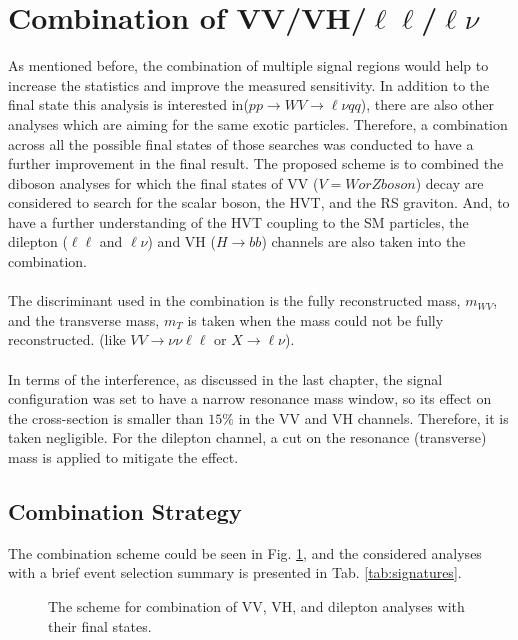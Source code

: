 \section{Combination of VV/VH/$\ell\ell$/$\ell\nu$}
As mentioned before, the combination of multiple signal regions would help to increase the statistics and improve the measured sensitivity.  In addition to the final state this analysis is interested in($pp\to WV \to \ell\nu qq$), there are also other analyses which are aiming for the same exotic particles. Therefore, a combination across all the possible final states of those searches was conducted to have a further improvement in the final result. The proposed scheme is to combined the diboson analyses for which the final states of VV ($V=W or Z boson$) decay are considered to search for the scalar boson, the HVT, and the RS graviton. And, to have a further understanding of the HVT coupling to the SM particles, the dilepton ($\ell\ell$ and $\ell\nu$) and VH ($H\to bb$) channels are also taken into the combination.
\\
\\The discriminant used in the combination is the fully reconstructed mass, $m_{WV}$, and the transverse mass, $m_{T}$ is taken when the mass could not be fully reconstructed. (like $VV\to\nu\nu\ell\ell$ or $X\to\ell\nu$).
\\
\\In terms of the interference, as discussed in the last chapter, the signal configuration was set to have a narrow resonance mass window, so its effect on the cross-section is smaller than $15\%$ in the VV and VH channels. Therefore, it is taken negligible. For the dilepton channel, a cut on the resonance (transverse) mass is applied to mitigate the effect. 
\subsection{Combination Strategy}
The combination scheme could be seen in Fig. \ref{Fig:Comb_scheme}, and the considered analyses with a brief event selection summary is presented in Tab. \ref{tab:signatures}.
\begin{figure}[ht]
	\centering
	\caption{The scheme for combination of VV, VH, and dilepton analyses with their final states.}
	\label{Fig:Comb_scheme}
\end{figure}


